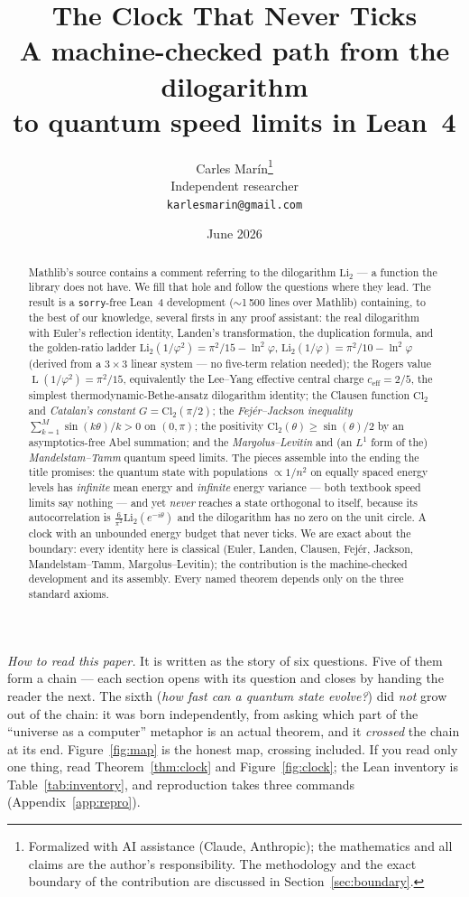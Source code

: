 \documentclass[11pt]{article}
\title{\bf The Clock That Never Ticks\\[4pt]
  \large\normalfont A machine-checked path from the dilogarithm\\
  to quantum speed limits in Lean~4}
\author{Carles Mar\'in\thanks{Formalized with AI assistance (Claude, Anthropic); the
mathematics and all claims are the author's responsibility. The methodology and the
exact boundary of the contribution are discussed in Section~\ref{sec:boundary}.}\\[3pt]
  \normalsize Independent researcher\\
  \normalsize \texttt{karlesmarin@gmail.com}}
\date{June 2026}
\newcommand{\lean}[1]{\texttt{#1}}
\newcommand{\Li}{\mathrm{Li}_2}
\newcommand{\Cl}{\mathrm{Cl}_2}
\DeclareMathOperator{\Lrog}{L}
\begin{document}
\maketitle

\begin{abstract}
Mathlib's source contains a comment referring to the dilogarithm $\Li$ --- a function the
library does not have. We fill that hole and follow the questions where they lead. The
result is a \lean{sorry}-free Lean~4 development ($\sim$1\,500 lines over Mathlib)
containing, to the best of our knowledge, several firsts in any proof assistant: the
real dilogarithm with Euler's reflection identity, Landen's transformation, the
duplication formula, and the golden-ratio ladder
$\Li(1/\varphi^2)=\pi^2/15-\ln^2\varphi$, $\Li(1/\varphi)=\pi^2/10-\ln^2\varphi$
(derived from a $3\times 3$ linear system --- no five-term relation needed); the Rogers
value $\Lrog(1/\varphi^2)=\pi^2/15$, equivalently the Lee--Yang effective central charge
$c_{\mathrm{eff}}=2/5$, the simplest thermodynamic-Bethe-ansatz dilogarithm identity;
the Clausen function $\Cl$ and \emph{Catalan's constant} $G=\Cl(\pi/2)$; the
\emph{Fej\'er--Jackson inequality} $\sum_{k=1}^{M}\sin(k\theta)/k>0$ on $(0,\pi)$; the
positivity $\Cl(\theta)\ge\sin(\theta)/2$ by an asymptotics-free Abel summation; and the
\emph{Margolus--Levitin} and (an $L^1$ form of the) \emph{Mandelstam--Tamm} quantum
speed limits. The pieces assemble into the ending the title promises: the quantum state
with populations $\propto 1/n^2$ on equally spaced energy levels has \emph{infinite}
mean energy and \emph{infinite} energy variance --- both textbook speed limits say
nothing --- and yet \emph{never} reaches a state orthogonal to itself, because its
autocorrelation is $\tfrac{6}{\pi^2}\Li(e^{-i\theta})$ and the dilogarithm has no zero
on the unit circle. A clock with an unbounded energy budget that never ticks. We are
exact about the boundary: every identity here is classical (Euler, Landen, Clausen,
Fej\'er, Jackson, Mandelstam--Tamm, Margolus--Levitin); the contribution is the
machine-checked development and its assembly. Every named theorem depends only on the
three standard axioms.
\end{abstract}

\medskip
\noindent\emph{How to read this paper.} It is written as the story of six questions.
Five of them form a chain --- each section opens with its question and closes by handing
the reader the next. The sixth (\emph{how fast can a quantum state evolve?}) did
\emph{not} grow out of the chain: it was born independently, from asking which part of
the ``universe as a computer'' metaphor is an actual theorem, and it \emph{crossed} the
chain at its end. Figure~\ref{fig:map} is the honest map, crossing included. If you read
only one thing, read Theorem~\ref{thm:clock} and Figure~\ref{fig:clock}; the Lean
inventory is Table~\ref{tab:inventory}, and reproduction takes three commands
(Appendix~\ref{app:repro}).
\end{document}

